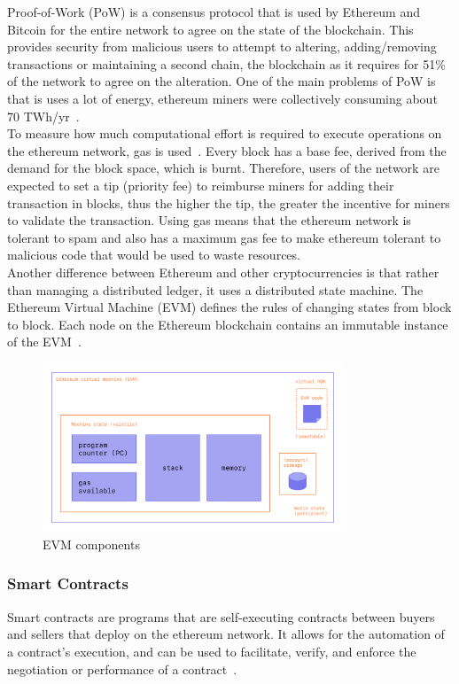 \noindent Proof-of-Work (PoW) is a consensus protocol that is used by Ethereum and Bitcoin for the entire network to agree on the state of the blockchain. This provides security from malicious users to attempt to altering, adding/removing transactions or maintaining a second chain, the blockchain as it requires for 51\% of the network to agree on the alteration. One of the main problems of PoW is that is uses a lot of energy, ethereum miners were collectively consuming about 70 TWh/yr~\cite{noauthor_proof--work_nodate}.
\\[5mm]
To measure how much computational effort is required to execute operations on the ethereum network, gas is used~\cite{noauthor_gas_nodate}. Every block has a base fee, derived from the demand for the block space, which is burnt. Therefore, users of the network are expected to set a tip (priority fee) to reimburse miners for adding their transaction in blocks, thus the higher the tip, the greater the incentive for miners to validate the transaction. Using gas means that the ethereum network is tolerant to spam and also has a maximum gas fee to make ethereum tolerant to malicious code that would be used to waste resources.
\\[5mm]
Another difference between Ethereum and other cryptocurrencies is that rather than managing a distributed ledger, it uses a distributed state machine. The Ethereum Virtual Machine (EVM) defines the rules of changing states from block to block. Each node on the Ethereum blockchain contains an immutable instance of the EVM~\cite{noauthor_ethereum_nodate}.

\begin{figure}[!htb]
    \centering
    \includegraphics[width=0.8\textwidth]{background/Images/evm.png}
    \caption{EVM components~\cite{noauthor_ethereum_nodate}}
\end{figure}

\subsubsection{Smart Contracts}
Smart contracts are programs that are self-executing contracts between buyers and sellers that deploy on the ethereum network. It allows for the automation of a contract's execution, and can be used to facilitate, verify, and enforce the negotiation or performance of a contract~\cite{noauthor_introduction_nodate, noauthor_smart_nodate}.

